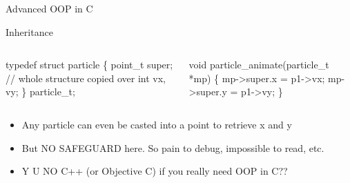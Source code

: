 \begin{frame}{Advanced OOP in C}
\begin{block}{Inheritance}
    \begin{columns}
      \begin{column}{.5\linewidth}
        \begin{boitecode}{}
typedef struct particle \{
  point_t super; // whole structure copied over
  int vx, vy;
\} particle_t;
        \end{boitecode}
      \end{column}
      \begin{column}{.39\linewidth}
        \begin{boitecode}{}
void particle_animate(particle_t *mp) \{
  mp->super.x = p1->vx;
  mp->super.y = p1->vy;
\}
        \end{boitecode}
      \end{column}
    \end{columns}\vspace{-.5\baselineskip}
    \begin{itemize}
    \item Any particle can even be casted into a point to retrieve x and y
    \item But NO SAFEGUARD here. So pain to debug, impossible to read, etc.
    \item Y U NO C++ (or Objective C) if you really need OOP in C??
    \end{itemize}

  \end{block}
\end{frame}
